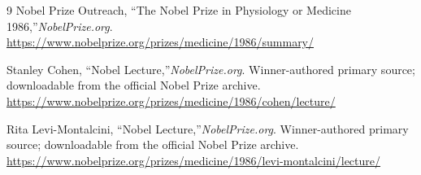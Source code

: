 \begin{thebibliography}{9}
Nobel Prize Outreach, ``The Nobel Prize in Physiology or Medicine 1986,''\emph{NobelPrize.org}.\\
\url{https://www.nobelprize.org/prizes/medicine/1986/summary/}

Stanley Cohen, ``Nobel Lecture,''\emph{NobelPrize.org}. Winner-authored primary source; downloadable from the official Nobel Prize archive.\\
\url{https://www.nobelprize.org/prizes/medicine/1986/cohen/lecture/}

Rita Levi-Montalcini, ``Nobel Lecture,''\emph{NobelPrize.org}. Winner-authored primary source; downloadable from the official Nobel Prize archive.\\
\url{https://www.nobelprize.org/prizes/medicine/1986/levi-montalcini/lecture/}
\end{thebibliography}
